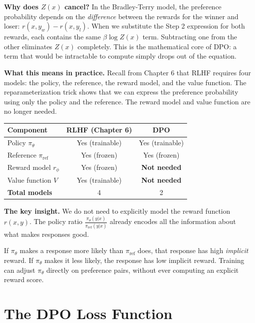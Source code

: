 \begin{chapterenv}
\textbf{Why does $Z(x)$ cancel?} In the Bradley-Terry model, the preference probability depends on the \textit{difference} between the rewards for the winner and loser: $r(x, y_w) - r(x, y_l)$. When we substitute the Step 2 expression for both rewards, each contains the same $\beta \log Z(x)$ term. Subtracting one from the other eliminates $Z(x)$ completely. This is the mathematical core of DPO: a term that would be intractable to compute simply drops out of the equation.

\textbf{What this means in practice.} Recall from Chapter 6 that RLHF requires four models: the policy, the reference, the reward model, and the value function. The reparameterization trick shows that we can express the preference probability using only the policy and the reference. The reward model and value function are no longer needed.

\begin{center}
\begin{tabular}{lcc}
\toprule
\textbf{Component} & \textbf{RLHF (Chapter 6)} & \textbf{DPO} \\
\midrule
Policy $\pi_\theta$ & Yes (trainable) & Yes (trainable) \\
Reference $\pi_{\text{ref}}$ & Yes (frozen) & Yes (frozen) \\
Reward model $r_\phi$ & Yes (frozen) & \textbf{Not needed} \\
Value function $V$ & Yes (trainable) & \textbf{Not needed} \\
\midrule
\textbf{Total models} & 4 & 2 \\
\bottomrule
\end{tabular}
\end{center}

\begin{infobox}
\textbf{The key insight.} We do not need to explicitly model the reward function $r(x,y)$. The policy ratio $\frac{\pi_\theta(y|x)}{\pi_{\text{ref}}(y|x)}$ already encodes all the information about what makes responses good.

If $\pi_\theta$ makes a response more likely than $\pi_{\text{ref}}$ does, that response has high \textit{implicit} reward. If $\pi_\theta$ makes it less likely, the response has low implicit reward. Training can adjust $\pi_\theta$ directly on preference pairs, without ever computing an explicit reward score.
\end{infobox}

\section{The DPO Loss Function}


\end{chapterenv}
